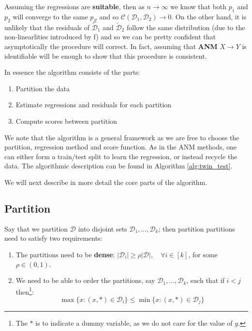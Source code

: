 Assuming the regressions are \textbf{suitable}, then as $n \rightarrow \infty$ we know that both 
$p_1$ and $p_2$ will converge to the same $p_Z$ and so $\mathcal{C}(\mathcal{D}_1, \mathcal{D}_2) \rightarrow 0$.
On the other hand, it is unlikely that the residuals of $\mathcal{\tilde{D}}_1$ and $\mathcal{\tilde{D}}_2$ 
follow the same distribution (due to the non-linearlities introduced by f) and 
so we can be pretty confident that asymptotically the procedure will correct. In fact, assuming that \textbf{ANM}
$X \rightarrow Y$ is identifiable will be enough to show that this procedure is consistent.

In essence the algorithm consists of the parts:

\begin{enumerate}
    \item Partition the data
    \item Estimate regressions and residuals for each partition
    \item Compute scores between partition
\end{enumerate}

We note that the algorithm is a general framework as we are free to choose the partition, regression method
and score function. As in the ANM methods, one can either form a train/test split to learn the regression, or
instead recycle the data. The algorithmic description can be found in Algorithm \ref{alg:twin_test}.

We will next describe in more detail the core parts of the algorithm.

\subsection{Partition}

Say that we partition
$\mathcal{D}$ into disjoint sets $\mathcal{D}_1, ..., \mathcal{D}_k$; then partition 
partitions need to satisfy two requirements:

\begin{enumerate}
    \item The partitions need to be \textbf{dense}: 
    $|\mathcal{D}_i| \geq \rho |\mathcal{D}|, \quad \forall i \in [k]$, for some $\rho \in (0, 1)$.
    \item We need to be able to order the partitions, say $\mathcal{D}_1, ..., \mathcal{D}_k$, such that
    if $i < j$ then\footnote{The $*$ is to indicate a dummy variable, as we do not care for the value of $y$.}: 
    $$
    \operatorname{max} \{ x : (x, *) \in \mathcal{D}_i \} \leq 
    \operatorname{min} \{ x : (x, *) \in \mathcal{D}_j \}
    $$
\end{enumerate}

